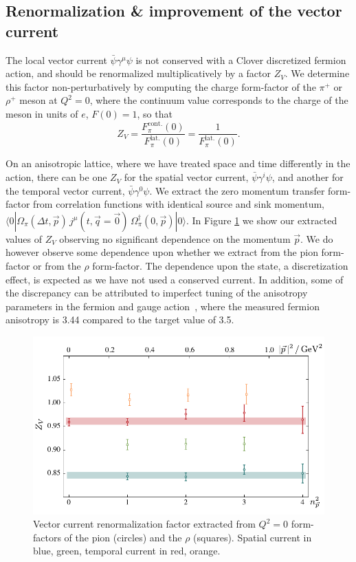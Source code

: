 \documentclass[twocolumn,amsmath,amssymb,prd,10pt,floatfix, 
superscriptaddress,nofootinbib, showpacs, preprintnumbers]{revtex4-1}
\begin{document}
\subsection{Renormalization \& improvement of the vector current \label{ssec::three_points_improv}}


The local vector current $\bar{\psi}\gamma^\mu \psi$ is not conserved with a Clover discretized fermion action, and should be renormalized multiplicatively by a factor $Z_V$. We determine this factor non-perturbatively by computing the charge form-factor of the $\pi^+$ or $\rho^+$ meson at $Q^2=0$, where the continuum value corresponds to the charge of the meson in units of $e$, $F(0) = 1$, so that 
\begin{equation}
	Z_V = \frac{F_\pi^\mathrm{cont.}(0)}{F^\mathrm{lat.}_\pi(0)} = \frac{1}{F^\mathrm{lat.}_\pi(0)} .
\end{equation}

On an anisotropic lattice, where we have treated space and time differently in the action, there can be one $Z_V$ for the spatial vector current, $\bar{\psi}\gamma^i \psi$, and another for the temporal vector current, $\bar{\psi}\gamma^0 \psi$. We extract the zero momentum transfer form-factor from correlation functions with identical source and sink momentum, ${\langle 0 | \Omega_\pi(\Delta t, \vec{p}) \, j^\mu(t, \vec{q}=\vec{0}) \, \Omega^\dag_\pi(0, \vec{p}) | 0 \rangle}$. In Figure \ref{fig::Z_V} we show our extracted values of $Z_V$ observing no significant dependence on the momentum $\vec{p}$. We do however observe some dependence upon whether we extract from the pion form-factor or from the $\rho$ form-factor. The dependence upon the state, a discretization effect, is expected as we have not used a conserved current. In addition, some of the discrepancy can be attributed to imperfect tuning of the anisotropy parameters in the fermion and gauge action~\cite{Edwards:2008ja}, where the measured fermion anisotropy is 3.44 compared to the target value of 3.5.


\begin{figure}[b]
\includegraphics[width=\linewidth]{fig10.pdf}
\caption{Vector current renormalization factor extracted from $Q^2=0$ form-factors of the pion (circles) and the $\rho$ (squares). Spatial current in blue, green, temporal current in red, orange. \label{fig::Z_V}}
\end{figure}
\end{document}
